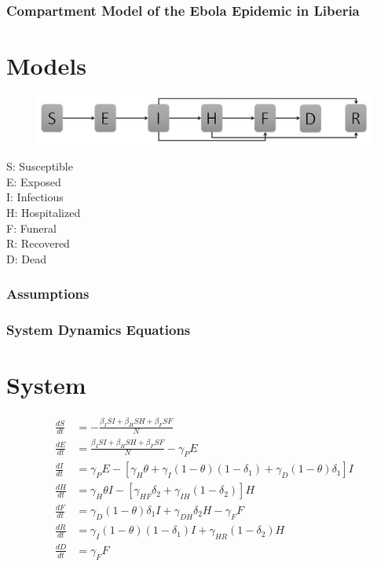 \documentclass[30pt]{beamer}
\begin{document}
\begin{frame}
\frametitle{Compartment Model of the Ebola Epidemic in Liberia}
\section{Models}

\begin{figure}[!h]
  \centering
  \includegraphics[width=1\textwidth]{compartmentNoFlow}
 \label{fig:compartment} 
\end{figure}

 S: Susceptible\\
 E: Exposed \\
I: Infectious \\
H: Hospitalized \\
 F: Funeral  \\
R: Recovered \\
D: Dead 
\end{frame}



\begin{frame}
\frametitle{Assumptions}
\end{frame}



\begin{frame}
\frametitle{System Dynamics Equations}
\section{System}
\begin{align*} 
\label{SDeqn}
\frac{dS}{dt} &= - \frac{\beta_{I}SI+\beta_{H}SH+\beta_{F}SF}{N} \\
\frac{dE}{dt} &=  \frac{\beta_{I}SI+\beta_{H}SH+\beta_{F}SF}{N}-\gamma_P E \\
\frac{dI}{dt} &=  \gamma_P E - [\gamma_{H}\theta + \gamma_{I}(1-\theta)(1-\delta_{1})+\gamma_{D}(1-\theta)\delta_{1}]I \\
\frac{dH}{dt} &= \gamma_{H}\theta I - [\gamma_{HF}\delta_{2}+\gamma_{IH}(1-\delta_{2})]H\\
\frac{dF}{dt} &= \gamma_{D}(1-\theta) \delta_{1} I + \gamma_{DH}\delta_{2} H-\gamma_{F} F \\
\frac{dR}{dt} &= \gamma_{I}(1-\theta)(1- \delta_{1}) I + \gamma_{HR}(1-\delta_{2}) H\\
\frac{dD}{dt} &= \gamma_{F} F 
\end{align*}
\end{frame}
\end{document}
